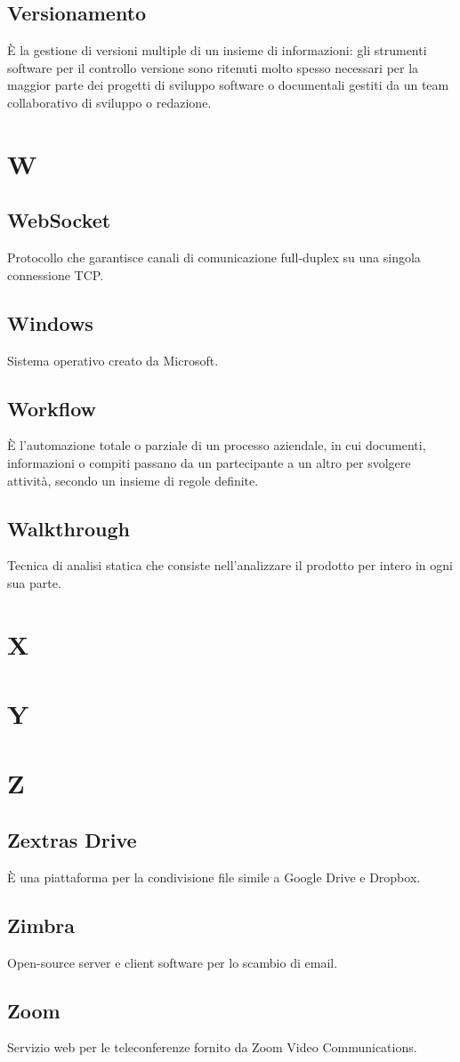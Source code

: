 \subsection{Versionamento} È la gestione di versioni multiple di un insieme di informazioni: gli strumenti software per il controllo versione sono ritenuti molto spesso necessari per la maggior parte dei progetti di sviluppo software o documentali gestiti da un team collaborativo di sviluppo o redazione.
\newpage \section{W}
\subsection{WebSocket} Protocollo che garantisce canali di comunicazione full-duplex su una singola connessione TCP.
\subsection{Windows} Sistema operativo creato da Microsoft.
\subsection{Workflow} È l’automazione totale o parziale di un processo aziendale, in cui documenti, informazioni o compiti passano da un partecipante a un altro per svolgere attività, secondo un insieme di regole definite.
\subsection{Walkthrough} Tecnica di analisi statica che consiste nell’analizzare il prodotto per intero in ogni sua parte.
\newpage \section{X}
\newpage \section{Y}
\newpage \section{Z}
\subsection{Zextras Drive} È una piattaforma per la condivisione file simile a Google Drive e Dropbox.
\subsection{Zimbra} Open-source server e client software per lo scambio di email.
\subsection{Zoom} Servizio web per le teleconferenze fornito da  Zoom Video Communications.